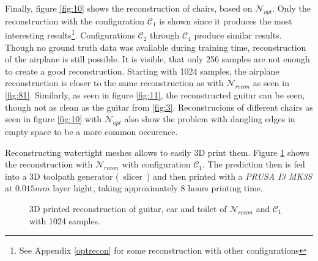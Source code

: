   Finally, figure \ref{fig:10} shows the reconstruction of chairs, based on $\mathcal{N}_{opt}$. Only the reconstruction with the configuration $\mathcal{C}_1$ is shown
  since it produces the most interesting results\footnote{See Appendix \ref{optrecon} for some reconstruction with other configurations}. Configurations $\mathcal{C}_2$ through $\mathcal{C}_4$ produce similar results. Though no ground truth data was available during training time, reconstruction
  of the airplane is still possible. It is visible, that only 256 samples are not enough to create a good reconstruction. Starting with 1024 samples, the airplane reconstruction
  is closer to the same reconstruction as with $\mathcal{N}_{recon}$ as seen in \ref{fig:81}. Similarly, as seen in figure \ref{fig:11}, the reconstructed guitar can be 
  seen, though not as clean as the guitar from \ref{fig:3}. Reconstrucions of different chairs as seen in figure \ref{fig:10} with $\mathcal{N}_{opt}$ also show the problem with dangling edges in empty space
  to be a more common occurence. 


  Reconstructing watertight meshes allows to easily 3D print them. Figure \ref{fig:13} shows the reconstruction with $\mathcal{N}_{recon}$ with configuration $\mathcal{C}_1$. 
  The prediction then is fed into a 3D toolpath generator (~slicer~)\cite{Ranellucci2011} and then printed with a \emph{PRUSA I3 MK3S} at $0.015mm$ layer hight, taking approximately 8 hours printing time.
  \begin{figure}[htbp]
    \centering
    \caption{3D printed reconstruction of guitar, car and toilet of $\mathcal{N}_{recon}$ and $\mathcal{C}_1$ with 1024 samples.} \label{fig:13}
  \end{figure}
